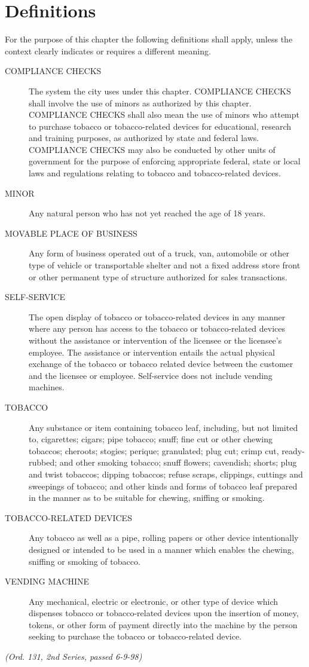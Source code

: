 \section{Definitions}
For the purpose of this chapter the following definitions shall apply, unless the context clearly indicates or requires a different meaning.
\begin{description}
    \item[COMPLIANCE CHECKS] The system the city uses under this chapter. COMPLIANCE CHECKS shall involve the use of minors as authorized by this chapter. COMPLIANCE CHECKS shall also mean the use of minors who attempt to purchase tobacco or tobacco-related devices for educational, research and training purposes, as authorized by state and federal laws. COMPLIANCE CHECKS may also be conducted by other units of government for the purpose of enforcing appropriate federal, state or local laws and regulations relating to tobacco and tobacco-related devices.
    \item[MINOR] Any natural person who has not yet reached the age of 18 years.
    \item[MOVABLE PLACE OF BUSINESS] Any form of business operated out of a truck, van, automobile or other type of vehicle or transportable shelter and not a fixed address store front or other permanent type of structure authorized for sales transactions.
    \item[SELF-SERVICE] The open display of tobacco or tobacco-related devices in any manner where any person has access to the tobacco or tobacco-related devices without the assistance or intervention of the licensee or the licensee’s employee.  The assistance or intervention entails the actual physical exchange of the tobacco or tobacco related device between the customer and the licensee or employee.  Self-service does not include vending machines.
    \item[TOBACCO] Any substance or item containing tobacco leaf, including, but not limited to, cigarettes; cigars; pipe tobacco; snuff; fine cut or other chewing tobaccos; cheroots; stogies; perique; granulated; plug cut; crimp cut, ready-rubbed; and other smoking tobacco; snuff flowers; cavendish; shorts; plug and twist tobaccos; dipping tobaccos; refuse scraps, clippings, cuttings and sweepings of tobacco; and other kinds and forms of tobacco leaf prepared in the manner as to be suitable for chewing, sniffing or smoking.
    \item[TOBACCO-RELATED DEVICES] Any tobacco as well as a pipe, rolling papers or other device intentionally designed or intended to be used in a manner which enables the chewing, sniffing or smoking of tobacco.
    \item[VENDING MACHINE] Any mechanical, electric or electronic, or other type of device which dispenses tobacco or tobacco-related devices upon the insertion of money, tokens, or other form of payment directly into the machine by the person seeking to purchase the tobacco or tobacco-related device.
\end{description}
\emph{(Ord. 131, 2nd Series, passed 6-9-98)}
